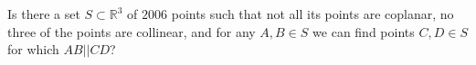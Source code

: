 Is there a set $S\subset\mathbb{R}^3$ of $2006$ points such that not all its points are coplanar, no three of the points are collinear, and for any $A,B\in S$ we can find points $C,D\in S$ for which $AB||CD$?